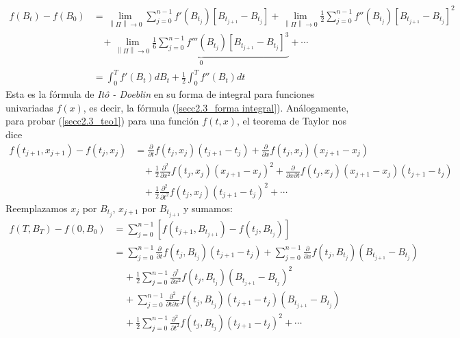 \documentclass[11pt,notitlepage]{article}
\begin{document}
\begin{align*}
    f(B_{t})-f(B_{0})&= \lim_{\left \| \Pi \right \| \rightarrow 0}\sum_{j=0}^{n-1} f'(B_{t_{j}})\left [ B_{t_{j+1}}-B_{t_{j}} \right ] +\lim_{\left \| \Pi \right \| \rightarrow 0}\frac{1}{2}\sum_{j=0}^{n-1} f''(B_{t_{j}})\left [ B_{t_{j+1}}-B_{t_{j}} \right ]^{2}\\ & \  \ \ \ +\underbrace{\lim_{\left \| \Pi \right \| \rightarrow 0}\frac{1}{6}\sum_{j=0}^{n-1} f'''(B_{t_{j}})\left [ B_{t_{j+1}}-B_{t_{j}} \right ]^{3}}_{0}+\cdots\\
    &=\int_{0}^{T}f'(B_{t})dB_{t}+\frac{1}{2}\int_{0}^{T}f''(B_{t})dt
\end{align*}
Esta es la fórmula de \textit{Itô - Doeblin} en su forma de integral para funciones univariadas $f(x)$, es decir, la fórmula (\ref{secc2.3_forma integral}). Análogamente, para probar (\ref{secc2.3_teo1}) para una función $f(t,x)$, el teorema de Taylor nos dice 
\begin{align*}
    f(t_{j+1},x_{j+1})-f(t_{j},x_{j})&= \frac{\partial}{\partial t}f(t_{j},x_{j})(t_{j+1}-t_{j})+\frac{\partial}{\partial x}f(t_{j},x_{j})(x_{j+1}-x_{j})\\
    & \  \ \ \ + \frac{1}{2} \frac{\partial^2}{\partial x^2}f(t_{j},x_{j})(x_{j+1}-x_{j})^2 + \frac{\partial}{\partial x\partial t}f(t_{j},x_{j})(x_{j+1}-x_{j})(t_{j+1}-t_{j})\\
    & \ \ \ \ + \frac{1}{2} \frac{\partial^2}{\partial t^2}f(t_{j},x_{j})(t_{j+1}-t_{j})^2+\cdots
\end{align*}
Reemplazamos $x_{j}$ por $B_{t_{j}}$, $x_{j+1}$ por $B_{t_{j+1}}$ y sumamos:
\begin{align*}
    f(T,B_{T})-f(0,B_{0})&= \sum_{j=0}^{n-1}\left [ f(t_{j+1},B_{t_{j+1}})-f(t_{j},B_{t_{j}}) \right ]\\
    &=\sum_{j=0}^{n-1}\frac{\partial}{\partial t}f(t_{j},B_{t_{j}})(t_{j+1}-t_{j})+\sum_{j=0}^{n-1}\frac{\partial}{\partial x}f(t_{j},B_{t_{j}})(B_{t_{j+1}}-B_{t_{j}})\\
    & \ \ \ \ \ +\frac{1}{2} \sum_{j=0}^{n-1} \frac{\partial^2}{\partial x^2}f(t_{j},B_{t_{j}})(B_{t_{j+1}}-B_{t_{j}})^2\\
    & \ \ \ \ \ +  \sum_{j=0}^{n-1} \frac{\partial^2}{\partial t \partial x}f(t_{j},B_{t_{j}})(t_{j+1}-t_{j})(B_{t_{j+1}}-B_{t_{j}})\\
    & \ \ \ \ \ +\frac{1}{2} \sum_{j=0}^{n-1} \frac{\partial^2}{\partial t^2}f(t_{j},B_{t_{j}})(t_{j+1}-t_{j})^2+\cdots
\end{align*}
\end{document}
